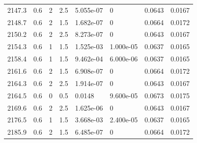 \documentclass[preview]{standalone}
\begin{document}
{{{{{\begin{tabular}{L{1.2cm}C{1.2cm} C{0.3cm}C{0.5cm} C{1.4cm}C{1.4cm} C{1.4cm}C{1.4cm}}
  2147.3  &   0.6  & 2     & 2.5 &  5.055e-07  & 0  & 0.0643 &  0.0167   \\ 
  2148.7  &   0.6  & 2     & 1.5 &  1.682e-07  & 0  & 0.0664 &  0.0172   \\ 
  2150.2  &   0.6  & 2     & 2.5 &  8.273e-07  & 0  & 0.0643 &  0.0167   \\ 
  2154.3  &   0.6  & 1     & 1.5 &  1.525e-03  & 1.000e-05  & 0.0637 &  0.0165   \\ 
  2158.4  &   0.6  & 1     & 1.5 &  9.462e-04  & 6.000e-06  & 0.0637 &  0.0165   \\ 
  2161.6  &   0.6  & 2     & 1.5 &  6.908e-07  & 0  & 0.0664 &  0.0172   \\ 
  2164.3  &   0.6  & 2     & 2.5 &  1.914e-07  & 0  & 0.0643 &  0.0167   \\ 
  2164.5  &   0.6  & 0     & 0.5 &  0.0148  & 9.600e-05  & 0.0673 &  0.0175   \\ 
  2169.6  &   0.6  & 2     & 2.5 &  1.625e-06  & 0  & 0.0643 &  0.0167   \\ 
  2176.5  &   0.6  & 1     & 1.5 &  3.668e-03  & 2.400e-05  & 0.0637 &  0.0165   \\ 
  2185.9  &   0.6  & 2     & 1.5 &  6.485e-07  & 0  & 0.0664 &  0.0172   \\ 
\hline 
\end{tabular} 

}}}}}
\end{document}
